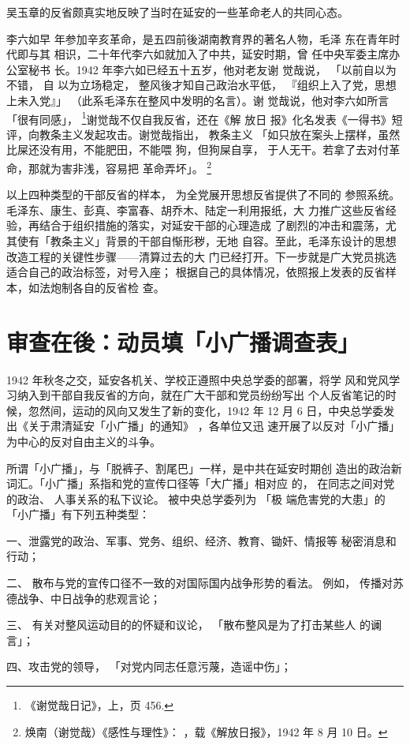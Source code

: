 吴玉章的反省颇真实地反映了当时在延安的一些革命老人的共同心态。

李六如早
年参加辛亥革命，是五四前後湖南教育界的著名人物，毛泽 东在青年时代即与其
相识，二十年代李六如就加入了中共，延安时期，曾 任中央军委主席办公室秘书
长。1942 年李六如已经五十五岁，他对老友谢 觉哉说， 「以前自以为不错， 自
以为立场稳定， 整风後才知自己政治水平低， 『组织上入了党，思想上未入党』」
（此系毛泽东在整风中发明的名言）。谢 觉哉说，他对李六如所言「很有同感」，
\footnote{《谢觉哉日记》，上，页 456.}谢觉哉不仅自我反省，还在《解 放日
报》化名发表《一得书》短评，向教条主义发起攻击。谢觉哉指出， 教条主义
「如只放在案头上摆样，虽然比屎还没有用，不能肥田，不能喂 狗，但狗屎自享，
于人无干。若拿了去对付革命，那就为害非浅，容易把 革命弄坏」。
\footnote{焕南（谢觉哉）《感性与理性》： ，载《解放日报》，1942 年 8
月 10 日。} 

以上四种类型的干部反省的样本，
为全党展开思想反省提供了不同的
参照系统。毛泽东、康生、彭真、李富春、胡乔木、陆定一利用报纸，大
力推广这些反省经验，再结合于组织措施的落实，对延安干部的心理造成
了剧烈的冲击和震荡，尤其使有「教条主义」背景的干部自惭形秽，无地
自容。至此，毛泽东设计的思想改造工程的关键性步骤——清算过去的大
门已经打开。下一步就是广大党员挑选适合自己的政治标签，对号入座；
根据自己的具体情况，依照报上发表的反省样本，如法炮制各自的反省检
查。

\section{审查在後：动员填「小广播调查表」}
1942 年秋冬之交，延安各机关、学校正遵照中央总学委的部署，将学
风和党风学习纳入到干部自我反省的方向，就在广大干部和党员纷纷写出
个人反省笔记的时候，忽然间，运动的风向又发生了新的变化，1942 年 12
月 6 日，中央总学委发出《关于肃清延安「小广播」的通知》
，各单位又迅
速开展了以反对「小广播」为中心的反对自由主义的斗争。

所谓「小广播」，与「脱裤子、割尾巴」一样，是中共在延安时期创
造出的政治新词汇。「小广播」系指和党的宣传口径等「大广播」相对应
的，
在同志之间对党的政治、
人事关系的私下议论。
被中央总学委列为
「极
端危害党的大患」的「小广播」有下列五种类型：

一、泄露党的政治、军事、党务、组织、经济、教育、锄奸、情报等
秘密消息和行动；

二、
散布与党的宣传口径不一致的对国际国内战争形势的看法。
例如，
传播对苏德战争、中日战争的悲观言论；

三、
有关对整风运动目的的怀疑和议论，
「散布整风是为了打击某些人
的谰言」；

四、攻击党的领导，
「对党内同志任意污蔑，造谣中伤」；

